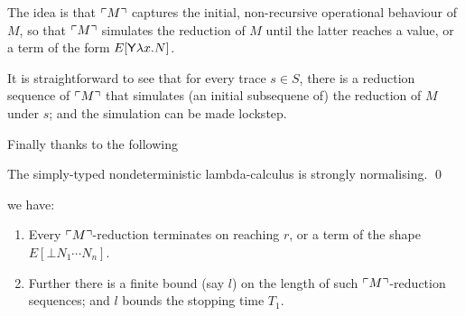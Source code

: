 The idea is that ${\ulcorner{M}\urcorner}$ captures the initial, non-recursive operational behaviour of $M$, so that ${\ulcorner{M}\urcorner}$ simulates the reduction of $M$ until the latter reaches a value, or a term of the form $E[\mathsf{Y} \lambda x. N]$.

It is straightforward to see that for every trace $s \in S$, there is a reduction sequence of ${\ulcorner{M}\urcorner}$ that simulates (an initial subsequene of) the reduction of $M$ under $s$;
and the simulation can be made lockstep.

Finally thanks to the following
\begin{theorem}[de Groote]
\label{thm:de groote}
The simply-typed nondeterministic lambda-calculus is strongly normalising. \qed
\end{theorem}
we have:

\begin{enumerate}
\item Every ${\ulcorner{M}\urcorner}$-reduction terminates on reaching $r$, or a term of the shape $E[\bot N_1 \cdots N_n]$.

\item Further there is a finite bound (say $l$) on the length of such ${\ulcorner{M}\urcorner}$-reduction sequences; and $l$ bounds the stopping time $T_1$.
\end{enumerate}


\iffalse
@inproceedings{DBLP:conf/lfcs/Groote94,
  author    = {Philippe de Groote},
  editor    = {Anil Nerode and
               Yuri V. Matiyasevich},
  title     = {Strong Normalization in a Non-Deterministic Typed Lambda-Calculus},
  booktitle = {Logical Foundations of Computer Science, Third International Symposium,
               LFCS'94, St. Petersburg, Russia, July 11-14, 1994, Proceedings},
  series    = {Lecture Notes in Computer Science},
  volume    = {813},
  pages     = {142--152},
  publisher = {Springer},
  year      = {1994},
  url       = {https://doi.org/10.1007/3-540-58140-5\_15},
  doi       = {10.1007/3-540-58140-5\_15},
  timestamp = {Tue, 14 May 2019 10:00:54 +0200},
  biburl    = {https://dblp.org/rec/conf/lfcs/Groote94.bib},
  bibsource = {dblp computer science bibliography, https://dblp.org}
}
\fi
